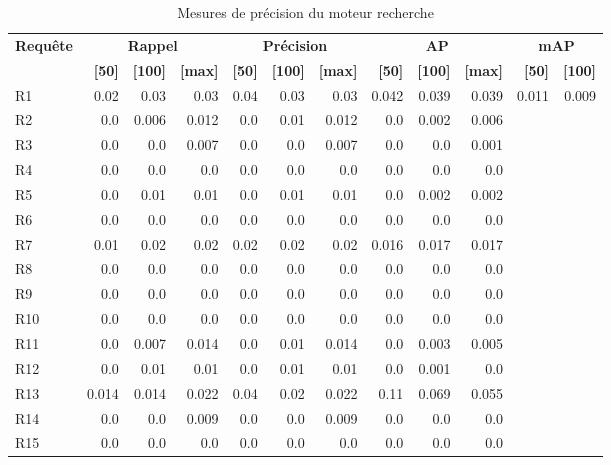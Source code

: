 \begin{table}[H]
\centering
\begin{tabular}{l|rrr|rrr|rrr|rr}
\toprule
\textbf{Requête} & \multicolumn{3}{c}{\textbf{Rappel}} & \multicolumn{3}{c}{\textbf{Précision}} & \multicolumn{3}{c}{\textbf{AP}} & \multicolumn{2}{c}{\textbf{mAP}} \\
 & \textbf{[50]} & \textbf{[100]} & \textbf{[max]} & \textbf{[50]} & \textbf{[100]} & \textbf{[max]} & \textbf{[50]} & \textbf{[100]} & \textbf{[max]} & \textbf{[50]} & \textbf{[100]} \\
\midrule
R1 & 0.02 & 0.03 & 0.03 & 0.04 & 0.03 & 0.03 & 0.042 & 0.039 & 0.039 & \multirow{15}{*}{0.011} & \multirow{15}{*}{0.009} \\
R2 & 0.0 & 0.006 & 0.012 & 0.0 & 0.01 & 0.012 & 0.0 & 0.002 & 0.006 \\
R3 & 0.0 & 0.0 & 0.007 & 0.0 & 0.0 & 0.007 & 0.0 & 0.0 & 0.001 \\
R4 & 0.0 & 0.0 & 0.0 & 0.0 & 0.0 & 0.0 & 0.0 & 0.0 & 0.0 \\
R5 & 0.0 & 0.01 & 0.01 & 0.0 & 0.01 & 0.01 & 0.0 & 0.002 & 0.002 \\
R6 & 0.0 & 0.0 & 0.0 & 0.0 & 0.0 & 0.0 & 0.0 & 0.0 & 0.0 \\
R7 & 0.01 & 0.02 & 0.02 & 0.02 & 0.02 & 0.02 & 0.016 & 0.017 & 0.017 \\
R8 & 0.0 & 0.0 & 0.0 & 0.0 & 0.0 & 0.0 & 0.0 & 0.0 & 0.0 \\
R9 & 0.0 & 0.0 & 0.0 & 0.0 & 0.0 & 0.0 & 0.0 & 0.0 & 0.0 \\
R10 & 0.0 & 0.0 & 0.0 & 0.0 & 0.0 & 0.0 & 0.0 & 0.0 & 0.0 \\
R11 & 0.0 & 0.007 & 0.014 & 0.0 & 0.01 & 0.014 & 0.0 & 0.003 & 0.005 \\
R12 & 0.0 & 0.01 & 0.01 & 0.0 & 0.01 & 0.01 & 0.0 & 0.001 & 0.0 \\
R13 & 0.014 & 0.014 & 0.022 & 0.04 & 0.02 & 0.022 & 0.11 & 0.069 & 0.055 \\
R14 & 0.0 & 0.0 & 0.009 & 0.0 & 0.0 & 0.009 & 0.0 & 0.0 & 0.0 \\
R15 & 0.0 & 0.0 & 0.0 & 0.0 & 0.0 & 0.0 & 0.0 & 0.0 & 0.0 \\
\bottomrule
\end{tabular}
\caption{Mesures de précision du moteur recherche}
\label{tab:results}
\end{table}
